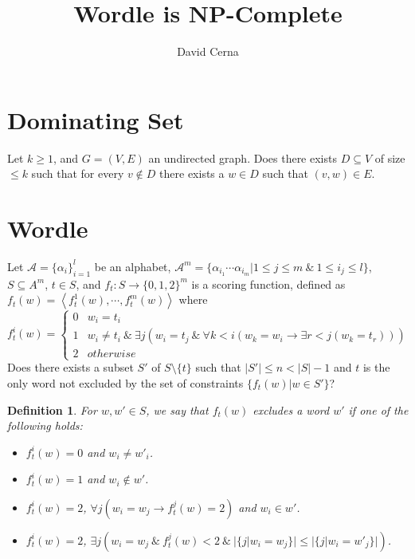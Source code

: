\documentclass[10pt,a4paper]{article}
\author{David Cerna}
\title{Wordle is NP-Complete}
\newtheorem{definition}{Definition}
\begin{document}
\maketitle


\section{Dominating Set}
Let $k\geq 1$,  and $G = (V, E)$ an undirected graph. Does there exists $D\subseteq V$ of size $\leq k$ such that for every $v\not \in D$ there exists a $w\in D$ such that $(v,w)\in E$.

\section{Wordle}
Let $\mathcal{A}= \{\alpha_{i}\}^{l}_{i=1}$ be an alphabet, $\mathcal{A}^{m} =\{ \alpha_{i_1}\cdots \alpha_{i_m}\vert 1\leq j\leq m\ \& \ 1\leq i_j\leq l\}$,  $S\subseteq A^m$, $t\in S$, and  $f_t:S\rightarrow \{0,1,2\}^m$ is a scoring function, defined as $f_t(w) = \left\langle f_t^1(w),\cdots, f_t^{m}(w)\right\rangle$ where
$$f_t^i(w) =\left\lbrace \begin{array}{cc}
0 &  w_i = t_i \\
1 & w_i \not = t_i\ \&\ \exists j(w_i = t_j \ \& \ \forall k< i(w_k =w_i \rightarrow \exists r< j (w_k=t_r)))\\
2 & otherwise
\end{array}\right.$$
Does there exists a subset $S'$ of $S\setminus \{t\}$ such that $\vert S'\vert \leq n< \vert S\vert-1 $ and $t$ is the only word not excluded by the set of constraints $\{f_t(w)\vert w\in S'\}$?

\begin{definition}
For $w,w'\in S$, we say that $f_t(w)$ excludes a word $w'$ if one of the following holds: 

\begin{itemize}
\item $f_t^i(w) = 0$ and $w_i\not= w'_i $. 
\item $f_t^i(w) = 1$ and $w_i \not \in w'$.
\item $f_t^i(w) = 2$, $\forall j( w_i = w_j\rightarrow f_t^j(w) = 2)$ and $w_i\in w'$.
\item $f_t^i(w) = 2$,  $\exists j( w_i = w_j \ \&\ f_t^j(w) < 2 \ \& \ \vert\{j\vert w_i=w_j\}\vert\leq \vert\{j\vert w_i=w'_j\}\vert)$.
\end{itemize}
\end{definition}
\end{document}
